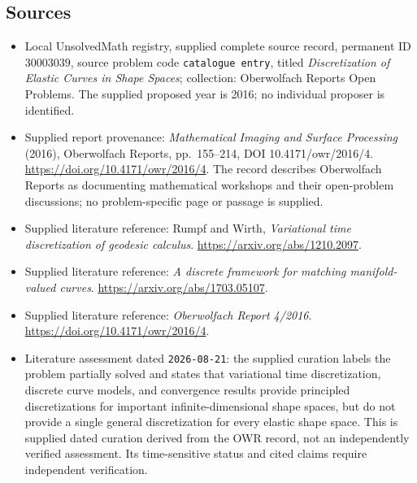 \documentclass[11pt]{article}
\begin{document}
\subsection{Sources}
\begin{itemize}
\item Local UnsolvedMath registry, supplied complete source record, permanent ID \(30003039\), source problem code \texttt{catalogue entry}, titled \emph{Discretization of Elastic Curves in Shape Spaces}; collection: Oberwolfach Reports Open Problems. The supplied proposed year is 2016; no individual proposer is identified.
\item Supplied report provenance: \emph{Mathematical Imaging and Surface Processing} (2016), Oberwolfach Reports, pp.\ 155--214, DOI 10.4171/owr/2016/4. \url{https://doi.org/10.4171/owr/2016/4}. The record describes Oberwolfach Reports as documenting mathematical workshops and their open-problem discussions; no problem-specific page or passage is supplied.
\item Supplied literature reference: Rumpf and Wirth, \emph{Variational time discretization of geodesic calculus}. \url{https://arxiv.org/abs/1210.2097}.
\item Supplied literature reference: \emph{A discrete framework for matching manifold-valued curves}. \url{https://arxiv.org/abs/1703.05107}.
\item Supplied literature reference: \emph{Oberwolfach Report 4/2016}. \url{https://doi.org/10.4171/owr/2016/4}.
\item Literature assessment dated \texttt{2026-08-21}: the supplied curation labels the problem partially solved and states that variational time discretization, discrete curve models, and convergence results provide principled discretizations for important infinite-dimensional shape spaces, but do not provide a single general discretization for every elastic shape space. This is supplied dated curation derived from the OWR record, not an independently verified assessment. Its time-sensitive status and cited claims require independent verification.
\end{itemize}
\end{document}
